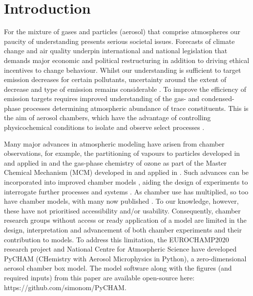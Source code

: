 \documentclass[gmd, manuscript]{copernicus}
\begin{document}

\section{Introduction}\label{sec:intro}

For the mixture of gases and particles (aerosol) that comprise atmospheres our paucity of understanding presents serious societal issues.  Forecasts of climate change and air quality underpin international and national legislation \citep[e.g.][]{UNFCCC2018, UKEnvironmentBill2020, EUAQ2020} that demands major economic and political restructuring \citep{MIT2020} in addition to driving ethical incentives to change behaviour.  Whilst our understanding is sufficient to target emission decreases for certain pollutants, uncertainty around the extent of decrease and type of emission remains considerable \citep{Heal2012, Johnson2018, Tong2019}.  To improve the efficiency of emission targets requires improved understanding of the gas- and condensed-phase processes determining atmospheric abundance of trace constituents.  This is the aim of aerosol chambers, which have the advantage of controlling physicochemical conditions to isolate and observe select processes \citep{Schwantes2017, Charan2019}.

Many major advances in atmospheric modeling have arisen from chamber observations, for example, the partitioning of vapours to particles developed in \citet{Odum1996} and applied in \citet[e.g.][]{Meng1997} and the gas-phase chemistry of ozone as part of the Master Chemical Mechanism (MCM) developed in \citet{Jenkin1997} and applied in \citet[e.g.][]{Ying2011}.  Such advances can be incorporated into improved chamber models \citep[e.g.][]{Charan2019}, aiding the design of experiments to interrogate further processes and systems \citep[e.g.][]{Riva2020}.  As chamber use has multiplied, so too have chamber models, with many now published \citep{Naumann2003, Pierce2008, Lowe2009, Roldin2014, Sunol2018, Topping2018, Charan2019, Roldin2019}.  To our knowledge, however, these have not prioritised accessibility and/or usability.  Consequently, chamber research groups without access or ready application of a model are limited in the design, interpretation and advancement of both chamber experiments and their contribution to models.  To address this limitation, the EUROCHAMP2020 \citep{EUROCHAMP2020} research project and National Centre for Atmospheric Science have developed PyCHAM (CHemistry with Aerosol Microphysics in Python), a zero-dimensional aerosol chamber box model.  The model software along with the figures (and required inputs) from this paper are available open-source here: https://github.com/simonom/PyCHAM.
\end{document}
